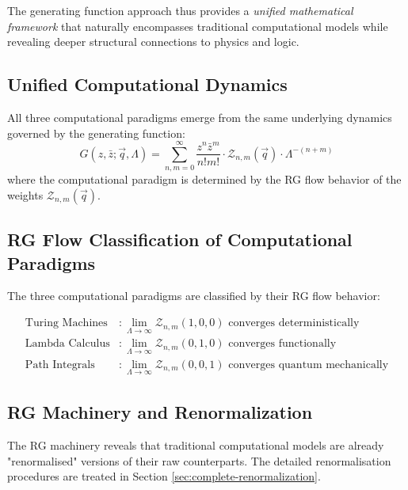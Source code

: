 The generating function approach thus provides a \emph{unified mathematical framework} that naturally encompasses traditional computational models while revealing deeper structural connections to physics and logic.

\subsection{Unified Computational Dynamics}

\begin{theorem}
\label{thm:unified-dynamics}
All three computational paradigms emerge from the same underlying dynamics governed by the generating function:
\[
G(z, \bar{z}; \vec{q}, \Lambda) = \sum_{n,m=0}^{\infty} \frac{z^n \bar{z}^m}{n! m!} \cdot \mathcal{Z}_{n,m}(\vec{q}) \cdot \Lambda^{-(n+m)}
\]
where the computational paradigm is determined by the RG flow behavior of the weights $\mathcal{Z}_{n,m}(\vec{q})$.
\end{theorem}

\subsection{RG Flow Classification of Computational Paradigms}

\begin{definition}
\label{def:rg-classification}
The three computational paradigms are classified by their RG flow behavior:

\begin{align}
\text{Turing Machines} &: \lim_{\Lambda \to \infty} \mathcal{Z}_{n,m}(1,0,0) \text{ converges deterministically} \\
\text{Lambda Calculus} &: \lim_{\Lambda \to \infty} \mathcal{Z}_{n,m}(0,1,0) \text{ converges functionally} \\
\text{Path Integrals} &: \lim_{\Lambda \to \infty} \mathcal{Z}_{n,m}(0,0,1) \text{ converges quantum mechanically}
\end{align}
\end{definition}

\subsection{RG Machinery and Renormalization}

The RG machinery reveals that traditional computational models are already "renormalised" versions of their raw counterparts. The detailed renormalisation procedures are treated in Section \ref{sec:complete-renormalization}.


